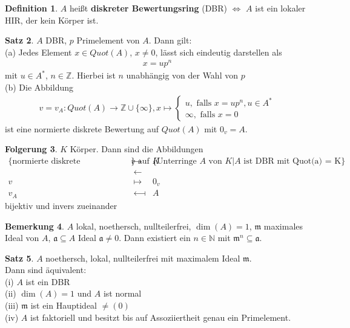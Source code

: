 \documentclass[10pt,a4paper,numbers=endperiod]{scrreprt}
\theoremstyle{definition}
\newtheorem{satz}{Satz}[section]
\newtheorem{defi}[satz]{Definition}
\newtheorem{bem}[satz]{Bemerkung}
\newtheorem{folg}[satz]{Folgerung}
\def\NN{{\mathbb N}}
\def\ZZ{{\mathbb Z}}
\begin{document}
\begin{defi}
	$A$ heißt \textbf{diskreter Bewertungsring} (DBR) $\Leftrightarrow$ $A$ ist ein lokaler HIR, der kein Körper ist.
\end{defi}

\begin{satz}
	$A$ DBR, $p$ Primelement von $A$. Dann gilt:\\
	(a) Jedes Element $x \in Quot(A)$, $x \neq 0$, lässt sich eindeutig darstellen als \begin{align*}
		x = up^n
	\end{align*}
	mit $u \in A^*$, $n \in \ZZ$. Hierbei ist $n$ unabhängig von der Wahl von $p$\\
	(b) Die Abbildung \begin{align*}
		v = v_A: Quot(A) \to \ZZ \cup \{\infty\}, x \mapsto \begin{cases}
		u, \text{ falls } x = up^n, u \in A^*\\
		\infty, \text{ falls } x = 0
		\end{cases}
	\end{align*}
	ist eine normierte diskrete Bewertung auf $Quot(A)$ mit $0_v = A$.
\end{satz}

\begin{folg}
	$K$ Körper. Dann sind die Abbildungen \begin{eqnarray*}
		\{\text{normierte diskrete Bewertungen $v$ auf $K$}\} & \longrightarrow & \{\text{Unterringe $A$ von $K$}| \text{$A$ ist DBR mit Quot(a) = K}\}\\
		&\longleftarrow&\\
		v &\longmapsto& 0_v\\
		v_A &\longmapsfrom& A
	\end{eqnarray*}
	bijektiv und invers zueinander
\end{folg}

\begin{bem}
	$A$ lokal, noethersch, nullteilerfrei, $\dim (A) = 1$, $\mathfrak{m}$ maximales Ideal von $A$, $\mathfrak{a} \subseteq A$ Ideal $\mathfrak{a} \neq 0$. Dann existiert ein $n \in \NN$ mit $\mathfrak{m}^n \subseteq \mathfrak{a}$.
\end{bem}

\begin{satz}
	$A$ noethersch, lokal, nullteilerfrei mit maximalem Ideal $\mathfrak{m}$.\\
	Dann sind äquivalent:\\
	(i) $A$ ist ein DBR\\
	(ii) $\dim(A) = 1$ und $A$ ist normal\\
	(iii) $\mathfrak{m}$ ist ein Hauptideal $\neq (0)$\\
	(iv) $A$ ist faktoriell und besitzt bis auf Assoziiertheit genau ein Primelement.
\end{satz}
\end{document}

